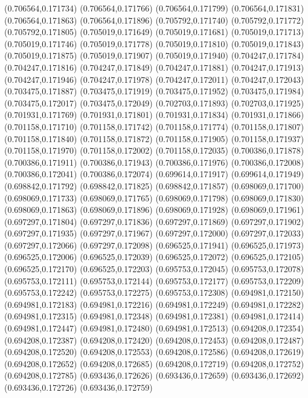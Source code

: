 (0.706564,0.171734)
(0.706564,0.171766)
(0.706564,0.171799)
(0.706564,0.171831)
(0.706564,0.171863)
(0.706564,0.171896)
(0.705792,0.171740)
(0.705792,0.171772)
(0.705792,0.171805)
(0.705019,0.171649)
(0.705019,0.171681)
(0.705019,0.171713)
(0.705019,0.171746)
(0.705019,0.171778)
(0.705019,0.171810)
(0.705019,0.171843)
(0.705019,0.171875)
(0.705019,0.171907)
(0.705019,0.171940)
(0.704247,0.171784)
(0.704247,0.171816)
(0.704247,0.171849)
(0.704247,0.171881)
(0.704247,0.171913)
(0.704247,0.171946)
(0.704247,0.171978)
(0.704247,0.172011)
(0.704247,0.172043)
(0.703475,0.171887)
(0.703475,0.171919)
(0.703475,0.171952)
(0.703475,0.171984)
(0.703475,0.172017)
(0.703475,0.172049)
(0.702703,0.171893)
(0.702703,0.171925)
(0.701931,0.171769)
(0.701931,0.171801)
(0.701931,0.171834)
(0.701931,0.171866)
(0.701158,0.171710)
(0.701158,0.171742)
(0.701158,0.171774)
(0.701158,0.171807)
(0.701158,0.171840)
(0.701158,0.171872)
(0.701158,0.171905)
(0.701158,0.171937)
(0.701158,0.171970)
(0.701158,0.172002)
(0.701158,0.172035)
(0.700386,0.171878)
(0.700386,0.171911)
(0.700386,0.171943)
(0.700386,0.171976)
(0.700386,0.172008)
(0.700386,0.172041)
(0.700386,0.172074)
(0.699614,0.171917)
(0.699614,0.171949)
(0.698842,0.171792)
(0.698842,0.171825)
(0.698842,0.171857)
(0.698069,0.171700)
(0.698069,0.171733)
(0.698069,0.171765)
(0.698069,0.171798)
(0.698069,0.171830)
(0.698069,0.171863)
(0.698069,0.171896)
(0.698069,0.171928)
(0.698069,0.171961)
(0.697297,0.171804)
(0.697297,0.171836)
(0.697297,0.171869)
(0.697297,0.171902)
(0.697297,0.171935)
(0.697297,0.171967)
(0.697297,0.172000)
(0.697297,0.172033)
(0.697297,0.172066)
(0.697297,0.172098)
(0.696525,0.171941)
(0.696525,0.171973)
(0.696525,0.172006)
(0.696525,0.172039)
(0.696525,0.172072)
(0.696525,0.172105)
(0.696525,0.172170)
(0.696525,0.172203)
(0.695753,0.172045)
(0.695753,0.172078)
(0.695753,0.172111)
(0.695753,0.172144)
(0.695753,0.172177)
(0.695753,0.172209)
(0.695753,0.172242)
(0.695753,0.172275)
(0.695753,0.172308)
(0.694981,0.172150)
(0.694981,0.172183)
(0.694981,0.172216)
(0.694981,0.172249)
(0.694981,0.172282)
(0.694981,0.172315)
(0.694981,0.172348)
(0.694981,0.172381)
(0.694981,0.172414)
(0.694981,0.172447)
(0.694981,0.172480)
(0.694981,0.172513)
(0.694208,0.172354)
(0.694208,0.172387)
(0.694208,0.172420)
(0.694208,0.172453)
(0.694208,0.172487)
(0.694208,0.172520)
(0.694208,0.172553)
(0.694208,0.172586)
(0.694208,0.172619)
(0.694208,0.172652)
(0.694208,0.172685)
(0.694208,0.172719)
(0.694208,0.172752)
(0.694208,0.172785)
(0.693436,0.172626)
(0.693436,0.172659)
(0.693436,0.172692)
(0.693436,0.172726)
(0.693436,0.172759)
